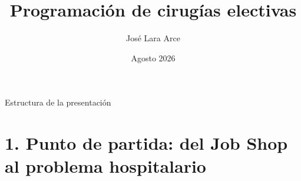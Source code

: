 \documentclass[aspectratio=169,11pt]{beamer}
\title[Programación quirúrgica: modelo y benchmark]{Programación de cirugías electivas}
\author[José Lara Arce]{José Lara Arce}
\institute[]{Escuela de Ingeniería Informática\\Pontificia Universidad Católica de Valparaíso}
\date{Agosto 2026}
\begin{document}
\begin{frame}[plain]
  \titlepage
\end{frame}

\begin{frame}{Estructura de la presentación}
  \tableofcontents
\end{frame}

\section{1. Punto de partida: del Job Shop al problema hospitalario}
\end{document}
